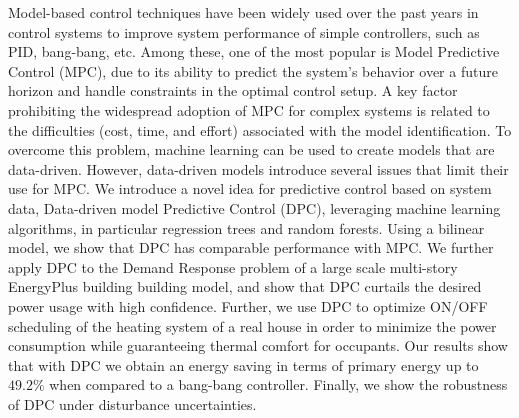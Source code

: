 Model-based control techniques have been widely used over the past years in control systems to improve system performance of simple controllers, such as PID, bang-bang, etc. Among these, one of the most popular is Model Predictive Control (MPC), due to its ability to predict the system's behavior over a future horizon and handle constraints in the optimal control setup.
A key factor prohibiting the widespread adoption of MPC for complex systems is related to the difficulties (cost, time, and effort) associated with the model identification. 
\textcolor[rgb]{0,0,1}{To overcome this problem, machine learning can be used to create models that are data-driven.
However, data-driven models introduce several issues that limit their use for MPC.
We introduce a novel idea for predictive control based on system data, Data-driven model Predictive Control (DPC)}, leveraging machine learning algorithms, in particular regression trees and random forests.
Using a bilinear model, we show that DPC has comparable performance with MPC.
We further apply DPC to the Demand Response problem of a large scale multi-story EnergyPlus building building model, and show that DPC curtails the desired power usage with high confidence.
Further, we use DPC to optimize ON/OFF scheduling of the heating system of a real house in order to minimize the power consumption while guaranteeing thermal comfort for occupants.
Our results show that with DPC we obtain an energy saving in terms of primary energy up to $49.2\%$ when compared to a bang-bang controller.
\textcolor[rgb]{0,0,1}{Finally, we show the robustness of DPC under disturbance uncertainties.}